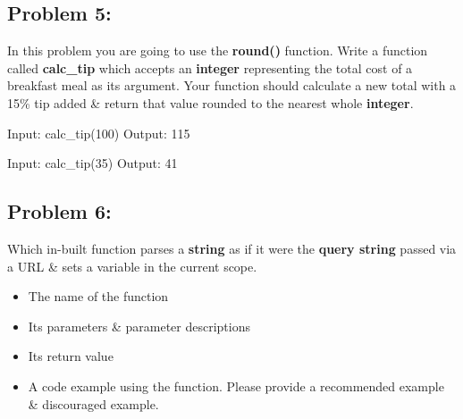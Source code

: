 \documentclass{article}
\begin{document}
\subsection*{Problem 5:}
In this problem you are going to use the \textbf{round()} function. Write a function called \textbf{calc\_tip} which accepts an \textbf{integer} representing the total cost of a breakfast meal as its argument. Your function should calculate a new total with a 15\% tip added \& return that value rounded to the nearest whole \textbf{integer}. 

\begin{verbatim*}
    Input: calc_tip(100)
    Output: 115 

    Input: calc_tip(35)
    Output: 41 
\end{verbatim*}

\subsection*{Problem 6:}
Which in-built function parses a \textbf{string} as if it were the \textbf{query string} passed via a URL \& sets a variable in the current scope.

\begin{itemize}
    \item The name of the function
    \item Its parameters \& parameter descriptions
    \item Its return value
    \item A code example using the function. Please provide a recommended example \& discouraged example. 
\end{itemize}
\end{document}
